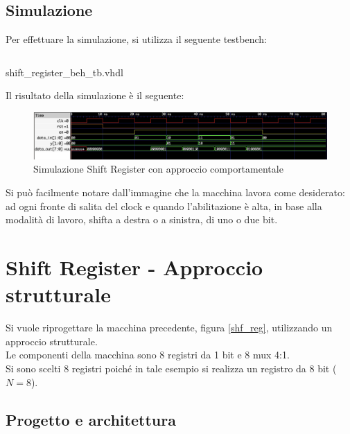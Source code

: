 \subsection{Simulazione}
Per effettuare la simulazione, si utilizza il seguente testbench:
\begin{code}
    \inputminted[frame=lines, framesep=2mm, baselinestretch=1.2, bgcolor=LightGray, fontsize=\footnotesize, linenos]{vhdl}{vhdl_files/shift_register_beh_tb.vhdl}
    \caption{shift\_register\_beh\_tb.vhdl}
    \label{lst:SR_beh_tb}
\end{code}
\noindent Il risultato della simulazione è il seguente:

\begin{figure}[H]
	\centering
	\includegraphics[width=1\textwidth]{img/simulazione_shift_register.png}
	\caption{Simulazione Shift Register con approccio comportamentale}
	\label{shf_reg_beh_sim} 
\end{figure}
Si può facilmente notare dall'immagine che la macchina lavora come desiderato: ad ogni fronte di salita del clock e quando l'abilitazione è alta, in base alla modalità di lavoro, shifta a destra o a sinistra, di uno o due bit.

\section{Shift Register - Approccio strutturale}
Si vuole riprogettare la macchina precedente, figura \ref{shf_reg}, utilizzando un approccio strutturale.\\
Le componenti della macchina sono 8 registri da 1 bit e 8 mux 4:1.\\
Si sono scelti 8 registri poiché in tale esempio si realizza un registro da 8 bit ($N=8$).
\subsection{Progetto e architettura}
